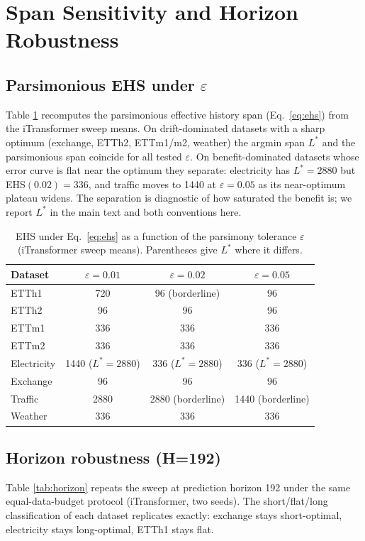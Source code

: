 \section{Span Sensitivity and Horizon Robustness}
\label{app:robust}

\subsection{Parsimonious EHS under \texorpdfstring{$\varepsilon$}{eps}}
Table \ref{tab:eps_sens} recomputes the parsimonious effective history span (Eq.\ \ref{eq:ehs}) from the iTransformer sweep means. On drift-dominated datasets with a sharp optimum (exchange, ETTh2, ETTm1/m2, weather) the argmin span $L^*$ and the parsimonious span coincide for all tested $\varepsilon$. On benefit-dominated datasets whose error curve is flat near the optimum they separate: electricity has $L^*{=}2880$ but EHS$(0.02){=}336$, and traffic moves to 1440 at $\varepsilon{=}0.05$ as its near-optimum plateau widens. The separation is diagnostic of how saturated the benefit is; we report $L^*$ in the main text and both conventions here.

\begin{table}[h]
\caption{EHS under Eq.\ \ref{eq:ehs} as a function of the parsimony tolerance $\varepsilon$ (iTransformer sweep means). Parentheses give $L^*$ where it differs.}
\label{tab:eps_sens}
\centering\small
\begin{tabular}{lccc}
\toprule
Dataset & $\varepsilon{=}0.01$ & $\varepsilon{=}0.02$ & $\varepsilon{=}0.05$ \\
\midrule
ETTh1 & 720 & 96 (borderline) & 96 \\
ETTh2 & 96 & 96 & 96 \\
ETTm1 & 336 & 336 & 336 \\
ETTm2 & 336 & 336 & 336 \\
Electricity & 1440 ($L^*{=}2880$) & 336 ($L^*{=}2880$) & 336 ($L^*{=}2880$) \\
Exchange & 96 & 96 & 96 \\
Traffic & 2880 & 2880 (borderline) & 1440 (borderline) \\
Weather & 336 & 336 & 336 \\
\bottomrule
\end{tabular}
\end{table}

\subsection{Horizon robustness (H=192)}
Table \ref{tab:horizon} repeats the sweep at prediction horizon 192 under the same equal-data-budget protocol (iTransformer, two seeds). The short/flat/long classification of each dataset replicates exactly: exchange stays short-optimal, electricity stays long-optimal, ETTh1 stays flat.

